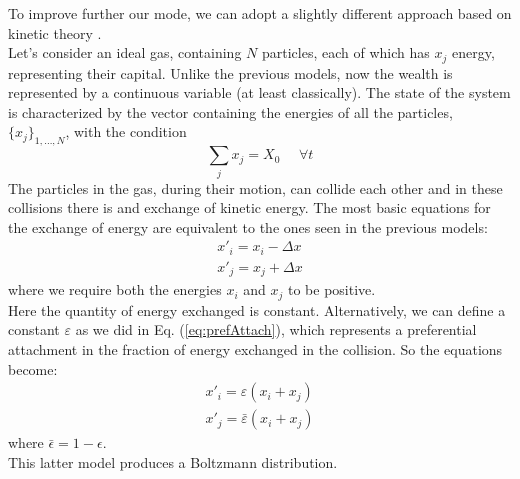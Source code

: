 To improve further our mode, we can adopt a slightly different approach based on kinetic theory \cite{econophysics}. \\
Let's consider an ideal gas, containing $N$ particles, each of which has $x_j$ energy, representing their capital.
Unlike the previous models, now the wealth is represented by a continuous variable (at least classically).
The state of the system is characterized by the vector containing the energies of all the particles, $\{x_j\}_{1,\ldots,N}$, with the condition 
\begin{equation}
	\sum_j x_j = X_0 \ \ \ \ \ \ \forall t	
\end{equation}
The particles in the gas, during their motion, can collide each other and in these collisions there is and exchange of kinetic energy.
The most basic equations for the exchange of energy are equivalent to the ones seen in the previous models:
\begin{equation}
	\begin{split}
		x'_i = x_i - \Delta x \\
		x'_j = x_j + \Delta x 
	\end{split}
\end{equation}
where we require both the energies $x_i$ and $x_j$ to be positive. \\
Here the quantity of energy exchanged is constant.
Alternatively, we can define a constant $\varepsilon$ as we did in Eq. (\ref{eq:prefAttach}), which represents a preferential attachment in the fraction of energy exchanged in the collision.
So the equations become:
\begin{equation}
	\begin{split}
		x'_i = \varepsilon(x_i + x_j)	 \\
		x'_j = \bar{\varepsilon}(x_i + x_j)
	\end{split}
\end{equation}
where $\bar{\epsilon} = 1 - \epsilon$. \\
This latter model produces a Boltzmann distribution.

